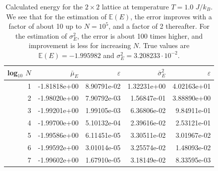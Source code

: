 \documentclass[]{article}
\begin{document}
\begin{table}[!h]
	\caption{Calculated energy for the $2 \times 2$ lattice at temperature $T=1.0$ $J/k_B$. We see that for the estimation of $\mathbb{E}(E)$, the error improves with a factor of about 10 up to $N = 10^5$, and a factor of 2 thereafter. For the estimation of $\sigma^2_E$, the error is about 100 times higher, and improvement is less for increasing $N$. True values are $\mathbb{E}(E) = -1.995982$ and $\sigma_E^2 = 3.208233 \cdot 10^{-2}$.}
	\label{tab:2x2-e-vals}
	\begin{center}
	\begin{tabular}{r|rr|rr}
		\toprule
		log$_{10}$ $N$ & $\bar{\mu}_E$ & $\varepsilon$ & $\bar{\sigma}^2_E$ & $\varepsilon$ \\
		\midrule
		1 & -1.81818e+00 & 8.90791e-02 & 1.32231e+00 & 4.02163e+01 \\
		2 & -1.98020e+00 & 7.90792e-03 & 1.56847e-01 & 3.88890e+00 \\
		3 & -1.99201e+00 & 1.99105e-03 & 6.36806e-02 & 9.84911e-01 \\
		4 & -1.99700e+00 & 5.10132e-04 & 2.39616e-02 & 2.53121e-01 \\
		5 & -1.99586e+00 & 6.11451e-05 & 3.30511e-02 & 3.01967e-02 \\
		6 & -1.99592e+00 & 3.01014e-05 & 3.25574e-02 & 1.48093e-02 \\
		7 & -1.99602e+00 & 1.67910e-05 & 3.18149e-02 & 8.33595e-03 \\
		\bottomrule
	\end{tabular}
	\end{center}
\end{table}
\end{document}
